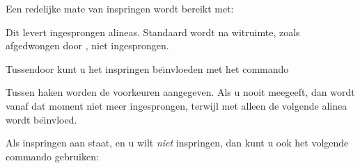 
Een redelijke mate van inspringen wordt bereikt met:

\starttypen
\stelinspringenin[middel]
\stoptypen

Dit levert ingesprongen alineas. Standaard wordt na
witruimte, zoals afgedwongen door \type {\blanko}, niet
ingesprongen.

Tussendoor kunt u het inspringen be\"\i nvloeden met het
commando


Tussen haken worden de voorkeuren aangegeven. Als u \type
{nooit} meegeeft, dan wordt vanaf dat moment niet meer
ingesprongen, terwijl met  alleen de volgende
alinea wordt be\"{\i}nvloed.

Als inspringen aan staat, en u wilt {\em niet} inspringen,
dan kunt u ook het volgende commando gebruiken:

\starttypen
\nietinspringen
\stoptypen

\stoponderdeel
